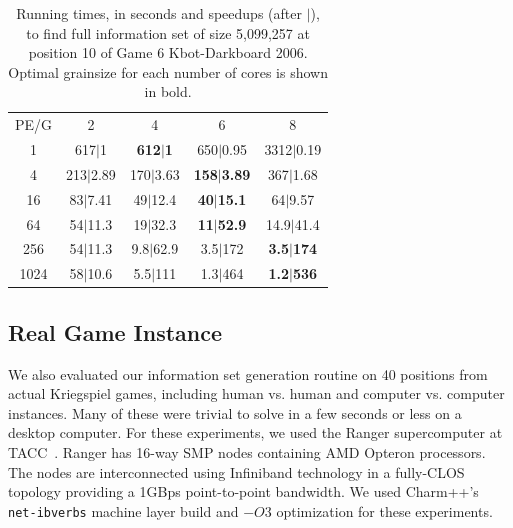 \documentclass[10pt, conference, compsocconf]{IEEEtran}
\begin{document}
\begin{table}[th]
\caption{Running times, in seconds and speedups (after $|$), to find full
information set of size 5,099,257 at position 10 of Game 6 Kbot-Darkboard 2006.
Optimal grainsize for each number of cores is shown in bold.}
\centering
\begin{tabular}{ccccc}
PE/G & 2 & 4 & 6 & 8 \\
1 & 617$|$1 & {\bf 612$|$1} & 650$|$0.95 & 3312$|$0.19 \\
4 & 213$|$2.89 & 170$|$3.63 & {\bf 158$|$3.89} & 367$|$1.68 \\
16 & 83$|$7.41 & 49$|$12.4 & {\bf 40$|$15.1} & 64$|$9.57 \\
64 & 54$|$11.3 & 19$|$32.3 & {\bf 11$|$52.9} & 14.9$|$41.4 \\
256 & 54$|$11.3 & 9.8$|$62.9 & 3.5$|$172 & {\bf 3.5$|$174} \\
1024 & 58$|$10.6 & 5.5$|$111 & 1.3$|$464 & {\bf 1.2$|$536} \\
\end{tabular}

\label{tab:prob5}
\vspace{-0.1in}
\end{table}

\subsection{Real Game Instance}
%
%
%
%
%

We also evaluated our information set generation routine on 40 positions from
actual Kriegspiel games, including human vs. human and computer vs. computer
instances.  Many of these were trivial to solve in a few seconds or less on a
desktop computer.  For these experiments, we used the Ranger supercomputer
at TACC~\cite{ranger}. Ranger has 16-way SMP nodes containing AMD Opteron
processors. The nodes are interconnected using Infiniband technology in a
fully-CLOS topology providing a 1GBps point-to-point bandwidth. We used {\sc Charm++}'s \texttt{net-ibverbs} machine layer build and $-O3$ optimization for these experiments.
\end{document}
